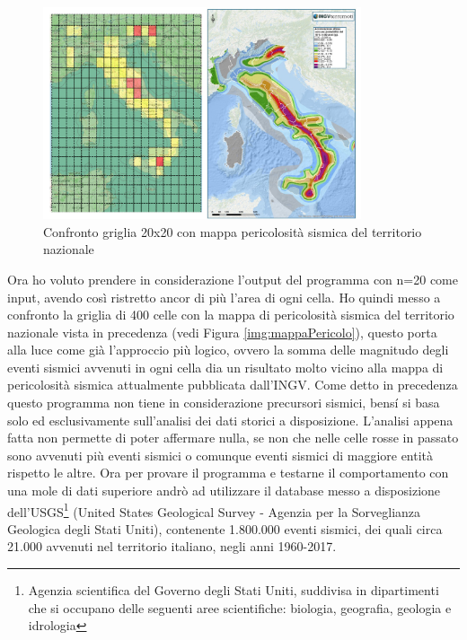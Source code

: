 \begin{figure}[H]
   \centering
   \includegraphics[width=0.835\textwidth]{images/mappaPericolositaVs20x20.jpg}
   \caption{Confronto griglia 20x20 con mappa pericolosit\`a sismica del territorio nazionale}
   \label{fig:20x20vsWarningMap}
\end{figure}

Ora ho voluto prendere in considerazione l'output del programma con n=20 come input, avendo cos\`i ristretto ancor di pi\`u l'area di ogni cella. Ho quindi messo a confronto la griglia di 400 celle con la mappa di pericolosit\`a sismica del territorio nazionale vista in precedenza (vedi Figura \ref{img:mappaPericolo}), questo porta alla luce come gi\`a l'approccio pi\`u logico, ovvero la somma delle magnitudo degli eventi sismici avvenuti in ogni cella dia un risultato molto vicino alla mappa di pericolosit\`a sismica attualmente pubblicata dall'INGV. Come detto in precedenza questo programma non tiene in considerazione precursori sismici, bens\'i si basa solo ed esclusivamente sull'analisi dei dati storici a disposizione. L'analisi appena fatta non permette di poter affermare nulla, se non che nelle celle rosse in passato sono avvenuti pi\`u eventi sismici o comunque eventi sismici di maggiore entit\`a rispetto le altre. Ora per provare il programma e testarne il comportamento con una mole di dati superiore andr\`o ad utilizzare il database messo a disposizione dell'USGS\footnote{Agenzia scientifica del Governo degli Stati Uniti, suddivisa in dipartimenti che si occupano delle seguenti aree scientifiche: biologia, geografia, geologia e idrologia} (United States Geological Survey - Agenzia per la Sorveglianza Geologica degli Stati Uniti), contenente 1.800.000 eventi sismici, dei quali circa 21.000 avvenuti nel territorio italiano, negli anni 1960-2017.

